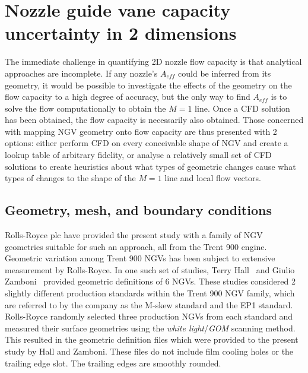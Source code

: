 \documentclass[a4paper, 11pt, oneside]{report}
\begin{document}
\section{Nozzle guide vane capacity uncertainty in 2 dimensions}
\label{section_1d_vs_2d_capacity_uncertainty}

The immediate challenge in quantifying 2D nozzle flow capacity is that analytical approaches are incomplete. If any nozzle's $A_{eff}$ could be inferred from its geometry, it would be possible to investigate the effects of the geometry on the flow capacity to a high degree of accuracy, but the only way to find $A_{eff}$ is to solve the flow computationally to obtain the $M=1$ line. Once a CFD solution has been obtained, the flow capacity is necessarily also obtained. Those concerned with mapping NGV geometry onto flow capacity are thus presented with 2 options: either perform CFD on every conceivable shape of NGV and create a lookup table of arbitrary fidelity, or analyse a relatively small set of CFD solutions to create heuristics about what types of geometric changes cause what types of changes to the shape of the $M=1$ line and local flow vectors.

\subsection{Geometry, mesh, and boundary conditions}

Rolls-Royce plc have provided the present study with a family of NGV geometries suitable for such an approach, all from the Trent 900 engine. Geometric variation among Trent 900 NGVs has been subject to extensive measurement by Rolls-Royce. In one such set of studies, Terry Hall~\cite{hall_area} and Giulio Zamboni~\cite{zamboni_area} provided geometric definitions of 6 NGVs. These studies considered 2 slightly different production standards within the Trent 900 NGV family, which are referred to by the company as the M-skew standard and the EP1 standard. Rolls-Royce randomly selected three production NGVs from each standard and measured their surface geometries using the \textit{white light}/\textit{GOM} scanning method. This resulted in the geometric definition files which were provided to the present study by Hall and Zamboni. These files do not include film cooling holes or the trailing edge slot. The trailing edges are smoothly rounded.
\end{document}
